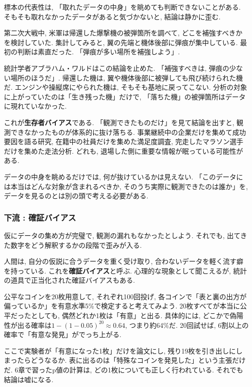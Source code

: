 標本の代表性は, 「取れたデータの中身」を眺めても判断できないことがある.
そもそも取れなかったデータがあると気づかないと, 結論は静かに歪む.

第二次大戦中, 米軍は帰還した爆撃機の被弾箇所を調べて, どこを補強すべきかを検討していた.
集計してみると, 翼の先端と機体後部に弾痕が集中している.
最初の判断は素直だった. 「弾痕が多い場所を補強しよう」.

統計学者アブラハム・ワルドはこの結論を止めた.
「補強すべきは, 弾痕の少ない場所のほうだ」.
帰還した機は, 翼や機体後部に被弾しても飛び続けられた機だ.
エンジンや操縦席にやられた機は, そもそも基地に戻ってこない.
分析の対象に上がっていたのは「生き残った機」だけで, 「落ちた機」の被弾箇所はデータに現れていなかった.

これが\textbf{生存者バイアス}である.
「観測できたものだけ」を見て結論を出すと, 観測できなかったものが体系的に抜け落ちる.
事業継続中の企業だけを集めて成功要因を語る研究, 在籍中の社員だけを集めた満足度調査, 完走したマラソン選手だけを集めた走法分析.
どれも, 退場した側に重要な情報が眠っている可能性がある.

データの中身を眺めるだけでは, 何が抜けているかは見えない.
「このデータには本当はどんな対象が含まれるべきか, そのうち実際に観測できたのは誰か」を, データを見るのとは別の頭で考える必要がある.

\subsubsection*{下流 : 確証バイアス}

仮にデータの集め方が完璧で, 観測の漏れもなかったとしよう.
それでも, 出てきた数字をどう解釈するかの段階で歪みが入る.

人間は, 自分の仮説に合うデータを重く受け取り, 合わないデータを軽く流す癖を持っている.
これを\textbf{確証バイアス}と呼ぶ.
心理的な現象として聞こえるが, 統計の道具で正当化された確証バイアスもある.

公平なコインを20枚用意して, それぞれ100回投げ, 各コインで「表と裏の出方が偏っているか」を有意水準5\%で検定すると考えてみよう.
20枚すべてが本当に公平だったとしても, 偶然どれか1枚は「有意」と出る.
具体的には, どこかで偽陽性が出る確率は$1 - (1 - 0.05)^{20} \approx 0.64$, つまり約64\%だ.
20回試せば, 6割以上の確率で「有意な発見」がでっち上がる.

ここで実験者が「有意になった1枚」だけを論文にし, 残り19枚を引き出しにしまったらどうなるか.
表に出るのは「特殊なコインを発見した」という主張だけだ.
6章で習ったp値の計算は, どの1枚についても正しく行われている.
それでも結論は嘘になる.

